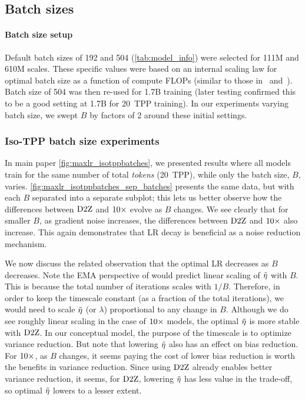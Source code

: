 \subsection{Batch sizes}\label{subsec:batches}

\paragraph{Batch size setup}

Default batch sizes of 192 and 504 (\cref{tab:model_info}) were
selected for 111M and 610M scales.  These specific values were based
on an internal scaling law for optimal batch size as a function of
compute FLOPs (similar to those in~\citet{bi2024deepseek}
and~\citet{porian2024resolving}).  Batch size of 504 was then re-used
for 1.7B training (later testing confirmed this to be a good setting
at 1.7B for 20~TPP training).  In our experiments varying batch size,
we swept $B$ by factors of 2 around these initial settings.

\subsubsection{Iso-TPP batch size experiments}




In main paper \cref{fig:maxlr_isotppbatches}, we presented results
where all models train for the same number of total \emph{tokens}
(20~TPP), while only the batch size, $B$, varies.
%
\cref{fig:maxlr_isotppbatches_sep_batches} presents the same data, but
with each $B$ separated into a separate subplot; this lets us better
observe how the differences between $\mbox{D2Z}$ and $\mbox{10}\times$ evolve as $B$
changes.
%
We see clearly that for smaller $B$, as gradient noise increases, the
differences between $\mbox{D2Z}$ and $\mbox{10}\times$ also increase.  This again
demonstrates that LR decay is beneficial as a noise reduction
mechanism.

We now discuss the related observation that the optimal LR decreases
as $B$ decreases.  Note the EMA perspective of \citet{wang2024how}
would predict linear scaling of $\tilde{\eta}$ with $B$.  This is because
the total number of iterations scales with $1/B$.  Therefore, in order
to keep the timescale constant (as a fraction of the total
iterations), we would need to scale $\tilde{\eta}$ (or $\lambda$)
proportional to any change in $B$.
%
Although we do see roughly linear scaling in the case of $\mbox{10}\times$
models, the optimal $\tilde{\eta}$ is more stable with $\mbox{D2Z}$.
%
In our conceptual model, the purpose of the timescale is to optimize
variance reduction.
%
But note that lowering $\tilde{\eta}$ also has an effect on bias reduction.
For $\mbox{10}\times$, as $B$ changes, it seems paying the cost of lower bias
reduction is worth the benefits in variance reduction.  Since using
$\mbox{D2Z}$ already enables better variance reduction, it seems, for
$\mbox{D2Z}$, lowering $\tilde{\eta}$ has less value in the trade-off, so
optimal $\tilde{\eta}$ lowers to a lesser extent.

